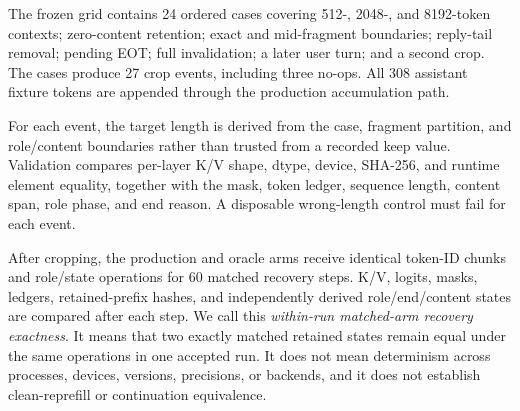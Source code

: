 The frozen grid contains 24 ordered cases covering 512-, 2048-, and 8192-token contexts; zero-content retention; exact and mid-fragment boundaries; reply-tail removal; pending EOT; full invalidation; a later user turn; and a second crop. The cases produce 27 crop events, including three no-ops. All 308 assistant fixture tokens are appended through the production accumulation path.

For each event, the target length is derived from the case, fragment partition, and role/content boundaries rather than trusted from a recorded keep value. Validation compares per-layer K/V shape, dtype, device, SHA-256, and runtime element equality, together with the mask, token ledger, sequence length, content span, role phase, and end reason. A disposable wrong-length control must fail for each event.

After cropping, the production and oracle arms receive identical token-ID chunks and role/state operations for 60 matched recovery steps. K/V, logits, masks, ledgers, retained-prefix hashes, and independently derived role/end/content states are compared after each step. We call this \emph{within-run matched-arm recovery exactness}. It means that two exactly matched retained states remain equal under the same operations in one accepted run. It does not mean determinism across processes, devices, versions, precisions, or backends, and it does not establish clean-reprefill or continuation equivalence.
